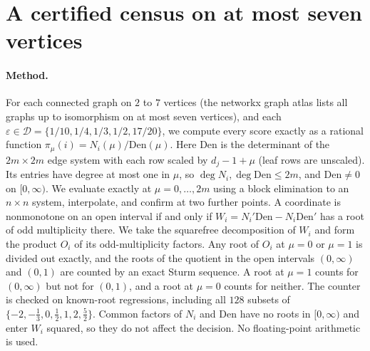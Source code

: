\documentclass[11pt,a4paper]{article}
\theoremstyle{definition}\newtheorem{conjecture}{Conjecture}
\theoremstyle{remark}\newtheorem{remark}[theorem]{Remark}
\newcommand{\eps}{\varepsilon}
\begin{document}
\section{A certified census on at most seven vertices}\label{sec:census}
\paragraph{Method.} For each connected graph on $2$ to $7$ vertices (the networkx graph atlas lists all graphs up to isomorphism on at most seven vertices), and each $\eps\in\mathcal D=\{1/10,1/4,1/3,1/2,17/20\}$, we compute every score exactly as a rational function $\pi_\mu(i)=N_i(\mu)/\mathrm{Den}(\mu)$. Here $\mathrm{Den}$ is the determinant of the $2m\times2m$ edge system with each row scaled by $d_j-1+\mu$ (leaf rows are unscaled). Its entries have degree at most one in $\mu$, so $\deg N_i,\deg\mathrm{Den}\leq2m$, and $\mathrm{Den}\neq0$ on $[0,\infty)$. We evaluate exactly at $\mu=0,\dots,2m$ using a block elimination to an $n\times n$ system, interpolate, and confirm at two further points. A coordinate is nonmonotone on an open interval if and only if $W_i=N_i'\mathrm{Den}-N_i\mathrm{Den}'$ has a root of odd multiplicity there. We take the squarefree decomposition of $W_i$ and form the product $O_i$ of its odd-multiplicity factors. Any root of $O_i$ at $\mu=0$ or $\mu=1$ is divided out exactly, and the roots of the quotient in the open intervals $(0,\infty)$ and $(0,1)$ are counted by an exact Sturm sequence. A root at $\mu=1$ counts for $(0,\infty)$ but not for $(0,1)$, and a root at $\mu=0$ counts for neither. The counter is checked on known-root regressions, including all $128$ subsets of $\{-2,-\tfrac13,0,\tfrac12,1,2,\tfrac52\}$. Common factors of $N_i$ and $\mathrm{Den}$ have no roots in $[0,\infty)$ and enter $W_i$ squared, so they do not affect the decision. No floating-point arithmetic is used.
\end{document}
